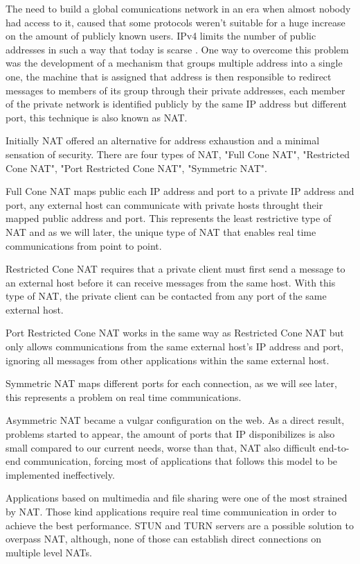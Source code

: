 The need to build a global comunications network in an era when almost nobody had access to it, caused that some protocols weren't suitable for a huge increase on the amount of publicly known users. \ac{IPv4} limits the number of public addresses in such a way that today is scarse \cite{ipv4}. One way to overcome this problem was the development of a mechanism that groups multiple address into a single one, the machine that is assigned that address is then responsible to redirect messages to members of its group through their private addresses, each member of the private network is identified publicly by the same \ac{IP} address but different port, this technique is also known as \ac{NAT}.

Initially \ac{NAT} offered an alternative for address exhaustion and a minimal sensation of security. There are four types of \ac{NAT}, "Full Cone NAT", "Restricted Cone NAT", "Port Restricted Cone NAT", "Symmetric NAT".

Full Cone \ac{NAT} maps public each \ac{IP} address and port to a private \ac{IP} address and port, any external host can communicate with private hosts throught their mapped public address and port. This represents the least restrictive type of \ac{NAT} and as we will later, the unique type of \ac{NAT} that enables real time communications from point to point.

Restricted Cone \ac{NAT} requires that a private client must first send a message to an external host before it can receive messages from the same host. With this type of \ac{NAT}, the private client can be contacted from any port of the same external host.

Port Restricted Cone \ac{NAT} works in the same way as Restricted Cone \ac{NAT} but only allows communications from the same external host's IP address and port, ignoring all messages from other applications within the same external host.

Symmetric NAT maps different ports for each connection, as we will see later, this represents a problem on real time communications.

Asymmetric \ac{NAT} became a vulgar configuration on the web. As a direct result, problems started to appear, the amount of ports that \ac{IP} disponibilizes is also small compared to our current needs, worse than that, \ac{NAT} also difficult end-to-end communication, forcing most of applications that follows this model to be implemented ineffectively.

Applications based on multimedia and file sharing were one of the most strained by \ac{NAT}. Those kind applications require real time communication in order to achieve the best performance. \ac{STUN} and \ac{TURN} \cite{natvoip} servers are a possible solution to overpass \ac{NAT}, although, none of those can establish direct connections on multiple level \ac{NAT}s.


